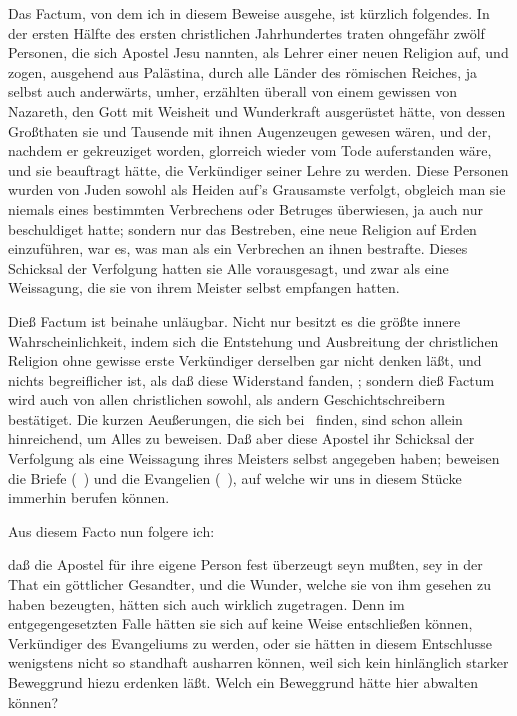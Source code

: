 \begin{aufza}
\item Das Factum, von dem ich in diesem Beweise ausgehe, ist kürzlich folgendes. In der ersten Hälfte des ersten christlichen Jahrhundertes traten ohngefähr zwölf Personen, die sich Apostel Jesu nannten, als Lehrer einer neuen Religion auf, und zogen, ausgehend aus Palästina, durch alle Länder des römischen Reiches, ja selbst auch anderwärts, umher, erzählten überall von einem gewissen  von Nazareth, den Gott mit Weisheit und Wunderkraft ausgerüstet hätte, von dessen Großthaten sie und Tausende mit ihnen Augenzeugen gewesen wären, und der, nachdem er gekreuziget worden, glorreich wieder vom Tode auferstanden wäre, und sie beauftragt hätte, die Verkündiger seiner Lehre zu werden. Diese Personen wurden von Juden sowohl als Heiden auf's Grausamste verfolgt, obgleich man sie niemals eines bestimmten Verbrechens oder Betruges überwiesen, ja auch nur beschuldiget hatte; sondern nur das Bestreben, eine neue Religion auf Erden einzuführen, war es, was man als ein Verbrechen an ihnen bestrafte. Dieses Schicksal der Verfolgung hatten sie Alle vorausgesagt, und zwar als eine Weissagung, die sie von ihrem Meister selbst empfangen hatten.
\item Dieß Factum ist beinahe unläugbar. Nicht nur besitzt es die größte innere Wahrscheinlichkeit, indem sich die Entstehung und Ausbreitung der christlichen Religion ohne gewisse erste Verkündiger derselben gar nicht denken läßt, und nichts begreiflicher ist, als daß diese Widerstand fanden, \usw ; sondern dieß Factum wird auch von allen christlichen sowohl, als andern Geschichtschreibern bestätiget. Die kurzen Aeußerungen, die sich bei  \uA\ finden, sind schon allein hinreichend, um Alles zu beweisen. Daß aber diese Apostel ihr Schicksal der Verfolgung als eine Weissagung ihres Meisters selbst angegeben haben; beweisen die Briefe  (\zB\ ) und die Evangelien (\zB\ ), auf welche wir uns in diesem Stücke immerhin berufen können.
\item Aus diesem Facto nun folgere ich:
\begin{aufzb}
\item daß die Apostel für ihre eigene Person fest überzeugt seyn mußten,  sey in der That ein göttlicher Gesandter, und die Wunder, welche sie von ihm gesehen zu haben bezeugten, hätten sich auch wirklich zugetragen. Denn im entgegengesetzten Falle hätten sie sich auf keine Weise entschließen können, Verkündiger des Evangeliums zu werden, oder sie hätten in diesem Entschlusse wenigstens nicht so standhaft ausharren können, weil sich kein hinlänglich starker Beweggrund hiezu erdenken läßt. Welch ein Beweggrund hätte hier abwalten können?

\end{aufzb}
\end{aufza}
